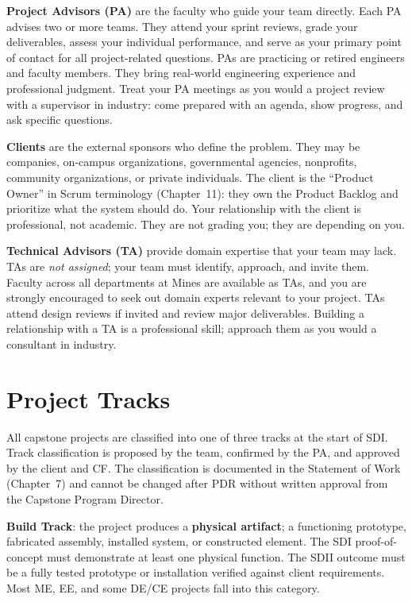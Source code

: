 \textbf{Project Advisors (PA)} are the faculty who guide your team directly. Each PA advises two or more teams. They attend your sprint reviews, grade your deliverables, assess your individual performance, and serve as your primary point of contact for all project-related questions. PAs are practicing or retired engineers and faculty members. They bring real-world engineering experience and professional judgment. Treat your PA meetings as you would a project review with a supervisor in industry: come prepared with an agenda, show progress, and ask specific questions.

\textbf{Clients} are the external sponsors who define the problem. They may be companies, on-campus organizations, governmental agencies, nonprofits, community organizations, or private individuals. The client is the ``Product Owner'' in Scrum terminology (Chapter~11): they own the Product Backlog and prioritize what the system should do. Your relationship with the client is professional, not academic. They are not grading you; they are depending on you.

\textbf{Technical Advisors (TA)} provide domain expertise that your team may lack. TAs are \emph{not assigned}; your team must identify, approach, and invite them. Faculty across all departments at Mines are available as TAs, and you are strongly encouraged to seek out domain experts relevant to your project. TAs attend design reviews if invited and review major deliverables. Building a relationship with a TA is a professional skill; approach them as you would a consultant in industry.


\section{Project Tracks}
All capstone projects are classified into one of three tracks at the start of SDI. Track classification is proposed by the team, confirmed by the PA, and approved by the client and CF. The classification is documented in the Statement of Work (Chapter~7) and cannot be changed after PDR without written approval from the Capstone Program Director.

\textbf{Build Track}: the project produces a \textbf{physical artifact}; a functioning prototype, fabricated assembly, installed system, or constructed element. The SDI proof-of-concept must demonstrate at least one physical function. The SDII outcome must be a fully tested prototype or installation verified against client requirements. Most ME, EE, and some DE/CE projects fall into this category.

